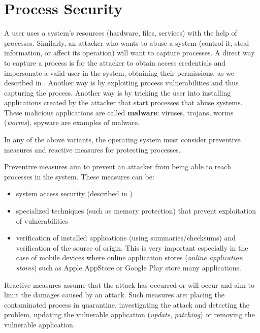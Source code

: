 \section{Process Security}
\label{sec:sec:process}

A user uses a system's resources (hardware, files, services) with the help of processes.
Similarly, an attacker who wants to abuse a system (control it, steal information, or affect its operation) will want to capture processes.
A direct way to capture a process is for the attacker to obtain access credentials and impersonate a valid user in the system, obtaining their permissions, as we described in .
Another way is by exploiting process vulnerabilities and thus capturing the process.
Another way is by tricking the user into installing applications created by the attacker that start processes that abuse systems.
These malicious applications are called \textbf{malware}: viruses, trojans, worms (\textit{worms}), spyware are examples of malware.

In any of the above variants, the operating system must consider preventive measures and reactive measures for protecting processes.

Preventive measures aim to prevent an attacker from being able to reach processes in the system.
These measures can be:

\begin{itemize}
  \item system access security (described in )
  \item specialized techniques (such as memory protection) that prevent exploitation of vulnerabilities
  \item verification of installed applications (using summaries/checksums) and verification of the source of origin.
    This is very important especially in the case of mobile devices where online application stores (\textit{online application stores}) such as Apple AppStore or Google Play store many applications.
\end{itemize}

Reactive measures assume that the attack has occurred or will occur and aim to limit the damages caused by an attack.
Such measures are: placing the contaminated process in quarantine, investigating the attack and detecting the problem, updating the vulnerable application (\textit{update}, \textit{patching}) or removing the vulnerable application.

